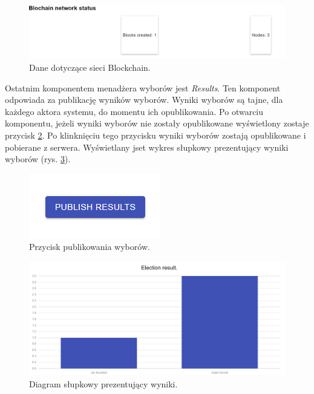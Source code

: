 \documentclass[a4paper,12pt]{book}
\begin{document}
\begin{figure}[H]
	\centering
	\includegraphics[width=\textwidth]{images/bcstatus.png}
	\caption{Dane dotyczące sieci Blockchain.}\label{bcstatus}
\end {figure}


Ostatnim komponentem menadżera wyborów jest \textit{Results}. Ten komponent odpowiada za publikację wyników wyborów. Wyniki wyborów są tajne, dla każdego aktora systemu, do momentu ich opublikowania. Po otwarciu komponentu, jeżeli wyniki wyborów nie zostały opublikowane wyświetlony zostaje przycisk \ref{publish}. Po klinknięciu tego przycisku wyniki wyborów zostają opublikowane i pobierane z serwera. Wyświetlany jset wykres słupkowy prezentujący wyniki wyborów (rys. \ref{adminelectionresult}).

\begin{figure}[H]
	\centering
	\includegraphics{images/publish.png}
	\caption{Przycisk publikowania wyborów.}\label{publish}
\end {figure}

\begin{figure}[H]
	\centering
	\includegraphics[width=\textwidth]{images/adminelectionresult.png}
	\caption{Diagram słupkowy prezentujący wyniki.}\label{adminelectionresult}
\end {figure}
\newpage
\end{document}
